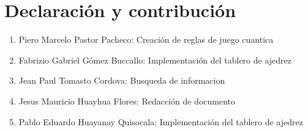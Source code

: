 \section{Declaración y contribución}
\begin{enumerate}
			\item Piero Marcelo Pastor Pacheco: Creación de reglas de juego cuantica\dotfill
			\item Fabrizio Gabriel Gómez  Buccallo: Implementación del tablero de ajedrez
			\item Jean Paul Tomasto Cordova: Busqueda de informacion 
			\item Jesus Mauricio Huayhua Flores: Redacción de documento 
			\item Pablo Eduardo Huayanay Quisocala: Implementación del tablero de ajedrez 
\end{enumerate}
